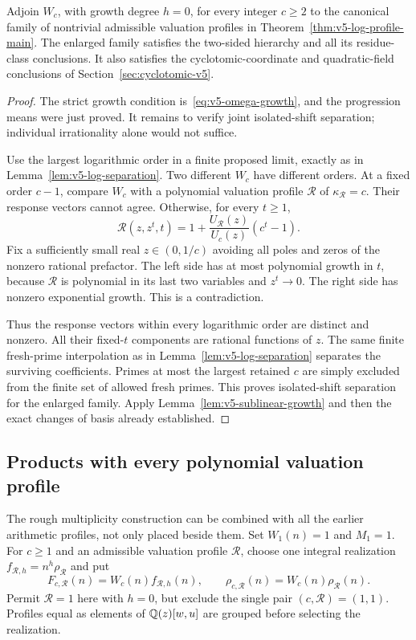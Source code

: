 \begin{theorem}
\label{thm:v5-rough-omega}
Adjoin $W_c$, with growth degree $h=0$, for every integer $c\geq2$
to the canonical family of nontrivial admissible valuation profiles
in Theorem~\ref{thm:v5-log-profile-main}.  The enlarged family satisfies
the two-sided hierarchy and all its residue-class conclusions.
It also satisfies the cyclotomic-coordinate and quadratic-field
conclusions of Section~\ref{sec:cyclotomic-v5}.
\end{theorem}

\begin{proof}
The strict growth condition is~\eqref{eq:v5-omega-growth}, and the
progression means were just proved.  It remains to verify joint
isolated-shift separation; individual irrationality alone would not
suffice.

Use the largest logarithmic order in a finite proposed limit, exactly
as in Lemma~\ref{lem:v5-log-separation}.  Two different $W_c$ have
different orders.  At a fixed order $c-1$, compare $W_c$ with a
polynomial valuation profile $\mathcal R$ of $\kappa_{\mathcal R}=c$.
Their response vectors cannot agree.  Otherwise, for every $t\geq1$,
\[
 \mathcal R(z,z^t,t)
  =1+\frac{U_{\mathcal R}(z)}{U_c(z)}(c^t-1).
\]
Fix a sufficiently small real $z\in(0,1/c)$ avoiding all poles and
zeros of the nonzero rational prefactor.  The left side has at most
polynomial growth in $t$, because $\mathcal R$ is polynomial in
its last two variables and $z^t\to0$.  The right side has nonzero
exponential growth.  This is a contradiction.

Thus the response vectors within every logarithmic order are distinct
and nonzero.  All their fixed-$t$ components are rational functions
of $z$.  The same finite fresh-prime interpolation as in
Lemma~\ref{lem:v5-log-separation} separates the surviving coefficients.
Primes at most the largest retained $c$ are simply excluded from
the finite set of allowed fresh primes.  This proves isolated-shift
separation for the enlarged family.
Apply Lemma~\ref{lem:v5-sublinear-growth} and then the exact changes
of basis already established.
\end{proof}

\subsection{Products with every polynomial valuation profile}

The rough multiplicity construction can be combined with all the
earlier arithmetic profiles, not only placed beside them.  Set
$W_1(n)=1$ and $M_1=1$.  For $c\geq1$ and an admissible valuation
profile $\mathcal R$, choose one integral realization
$f_{\mathcal R,h}=n^h\rho_{\mathcal R}$ and put
\[
 F_{c,\mathcal R}(n)=W_c(n)f_{\mathcal R,h}(n),\qquad
 \rho_{c,\mathcal R}(n)=W_c(n)\rho_{\mathcal R}(n).
\]
Permit $\mathcal R=1$ here with $h=0$, but exclude the single pair
$(c,\mathcal R)=(1,1)$.  Profiles equal as elements of
$\mathbb Q(z)[w,u]$ are grouped before selecting the realization.

